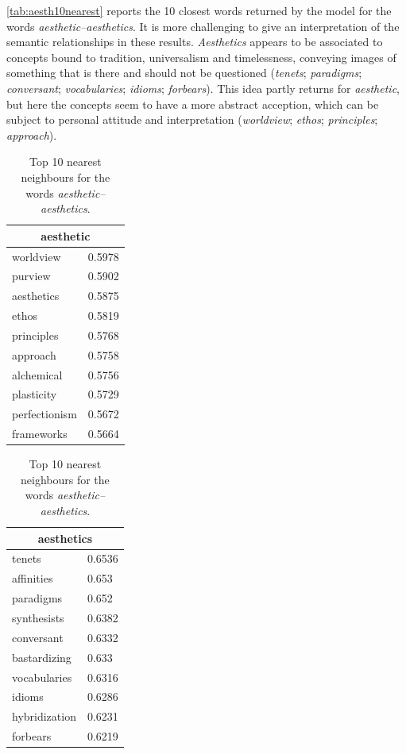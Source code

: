 \autoref{tab:aesth10nearest} reports the 10 closest words returned by the model for the words \emph{aesthetic--aesthetics}. It is more challenging to give an interpretation of the semantic relationships in these results. \emph{Aesthetics} appears to be associated to concepts bound to tradition, universalism and timelessness, conveying images of something that is there and should not be questioned (\emph{tenets}; \emph{paradigms}; \emph{conversant}; \emph{vocabularies}; \emph{idioms}; \emph{forbears}). This idea partly returns for \emph{aesthetic}, but here the concepts seem to have a more abstract acception, which can be subject to personal attitude and interpretation (\emph{worldview}; \emph{ethos}; \emph{principles}; \emph{approach}).

\begin{table}[bth]
\myfloatalign
\small
\begin{tabular}{ll}
\toprule
\multicolumn{2}{c}{aesthetic}\\ \midrule
worldview & 0.5978\\
purview & 0.5902\\
aesthetics & 0.5875\\
ethos & 0.5819\\
principles & 0.5768\\
approach & 0.5758\\
alchemical & 0.5756\\
plasticity & 0.5729\\
perfectionism & 0.5672\\
frameworks & 0.5664\\
\bottomrule
\end{tabular}
\begin{tabular}{ll}
\toprule
\multicolumn{2}{c}{aesthetics}\\ \midrule
tenets & 0.6536\\
affinities & 0.653\\
paradigms & 0.652\\
synthesists & 0.6382\\
conversant & 0.6332\\
bastardizing & 0.633\\
vocabularies & 0.6316\\
idioms & 0.6286\\
hybridization & 0.6231\\
forbears & 0.6219\\
\bottomrule
\end{tabular}
\caption[Nearest neighbours for \emph{aesthetic-aesthetics}]{Top 10 nearest neighbours for the words \emph{aesthetic--aesthetics}.}
\label{tab:aesth10nearest}
\end{table}

